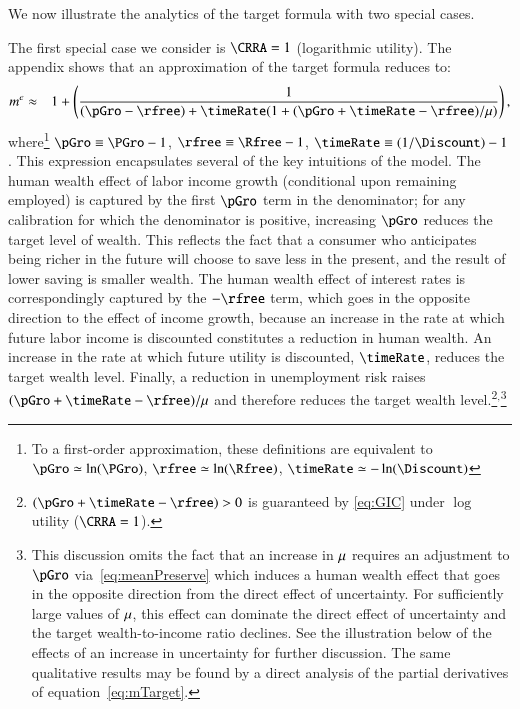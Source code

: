 \documentclass[titlepage,abstract]{\econtex}\newcommand{\texname}{ctDiscrete}
\begin{document}
We now illustrate the analytics of the target formula with two special cases.

The first special case we consider is $\CRRA = 1$ (logarithmic utility). The appendix shows that an approximation of the target formula reduces to:
\begin{eqnarray}
  \mTarg^{e} 
  & \approx & 
  1 + \left(\frac{1}{(\pGro-\rfree)+\timeRate(1+(\pGro+\timeRate-\rfree)/\urate)}\right) 
\label{eq:mTargetLogCase}
,
\end{eqnarray}
where\footnote{To a first-order approximation, these definitions are equivalent to
  $\pGro\simeq\ln(\PGro)$,  
  $\rfree\simeq\ln(\Rfree)$, 
  $\timeRate\simeq-\ln(\Discount)$}
$\pGro\equiv\PGro-1$, 
$\rfree\equiv\Rfree-1$, 
$\timeRate\equiv(1/\Discount)-1$.
This expression encapsulates several of the key intuitions of the
model.  The human wealth effect of labor income growth (conditional upon remaining employed) is captured by the first $\pGro$ term in the denominator; for any calibration for which
the denominator is positive, increasing $\pGro$ reduces the target
level of wealth.  This reflects the fact that a consumer who
anticipates being richer in the future will choose to save less in the
present, and the result of lower saving is smaller wealth.  The human
wealth effect of interest rates is correspondingly captured by the
$-\rfree$ term, which goes in the opposite direction to the effect of
income growth, because an increase in the rate at which future labor
income is discounted constitutes a reduction in human wealth.  
An increase in the rate at which future utility is
discounted, $\timeRate$, reduces the target wealth level.  Finally, a
reduction in unemployment risk raises
$(\pGro+\timeRate-\rfree)/\urate$ and therefore reduces the target
wealth level.\footnote{$(\pGro+\timeRate-\rfree) > 0$ is guaranteed by
\eqref{eq:GIC} 
under $\log$ utility
($\CRRA=1$).}$^{,}$\footnote{This discussion omits the fact that an
  increase in $\mu$ requires an adjustment to $\pGro$
  via~\eqref{eq:meanPreserve} which induces a human wealth effect that
  goes in the opposite direction from the direct effect of
  uncertainty.  For sufficiently large values of $\mu$, this effect
  can dominate the direct effect of uncertainty and the target
  wealth-to-income ratio declines.  See the illustration below of the
  effects of an increase in uncertainty for further discussion. 
  The same qualitative results may be found by a direct analysis of 
  the partial derivatives of equation~\eqref{eq:mTarget}. }
\end{document}
